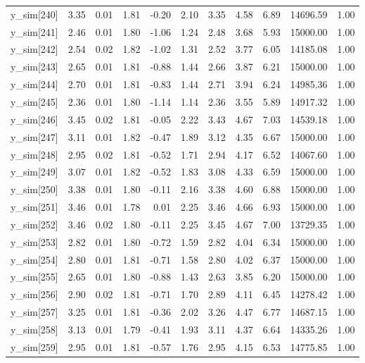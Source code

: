 \begin{table}[ht]
\begin{tabular}{rrrrrrrrrrr}
  y\_sim[240] & 3.35 & 0.01 & 1.81 & -0.20 & 2.10 & 3.35 & 4.58 & 6.89 & 14696.59 & 1.00 \\ 
  y\_sim[241] & 2.46 & 0.01 & 1.80 & -1.06 & 1.24 & 2.48 & 3.68 & 5.93 & 15000.00 & 1.00 \\ 
  y\_sim[242] & 2.54 & 0.02 & 1.82 & -1.02 & 1.31 & 2.52 & 3.77 & 6.05 & 14185.08 & 1.00 \\ 
  y\_sim[243] & 2.65 & 0.01 & 1.81 & -0.88 & 1.44 & 2.66 & 3.87 & 6.21 & 15000.00 & 1.00 \\ 
  y\_sim[244] & 2.70 & 0.01 & 1.81 & -0.83 & 1.44 & 2.71 & 3.94 & 6.24 & 14985.36 & 1.00 \\ 
  y\_sim[245] & 2.36 & 0.01 & 1.80 & -1.14 & 1.14 & 2.36 & 3.55 & 5.89 & 14917.32 & 1.00 \\ 
  y\_sim[246] & 3.45 & 0.02 & 1.81 & -0.05 & 2.22 & 3.43 & 4.67 & 7.03 & 14539.18 & 1.00 \\ 
  y\_sim[247] & 3.11 & 0.01 & 1.82 & -0.47 & 1.89 & 3.12 & 4.35 & 6.67 & 15000.00 & 1.00 \\ 
  y\_sim[248] & 2.95 & 0.02 & 1.81 & -0.52 & 1.71 & 2.94 & 4.17 & 6.52 & 14067.60 & 1.00 \\ 
  y\_sim[249] & 3.07 & 0.01 & 1.82 & -0.52 & 1.83 & 3.08 & 4.33 & 6.59 & 15000.00 & 1.00 \\ 
  y\_sim[250] & 3.38 & 0.01 & 1.80 & -0.11 & 2.16 & 3.38 & 4.60 & 6.88 & 15000.00 & 1.00 \\ 
  y\_sim[251] & 3.46 & 0.01 & 1.78 & 0.01 & 2.25 & 3.46 & 4.66 & 6.93 & 15000.00 & 1.00 \\ 
  y\_sim[252] & 3.46 & 0.02 & 1.80 & -0.11 & 2.25 & 3.45 & 4.67 & 7.00 & 13729.35 & 1.00 \\ 
  y\_sim[253] & 2.82 & 0.01 & 1.80 & -0.72 & 1.59 & 2.82 & 4.04 & 6.34 & 15000.00 & 1.00 \\ 
  y\_sim[254] & 2.80 & 0.01 & 1.81 & -0.71 & 1.58 & 2.80 & 4.02 & 6.37 & 15000.00 & 1.00 \\ 
  y\_sim[255] & 2.65 & 0.01 & 1.80 & -0.88 & 1.43 & 2.63 & 3.85 & 6.20 & 15000.00 & 1.00 \\ 
  y\_sim[256] & 2.90 & 0.02 & 1.81 & -0.71 & 1.70 & 2.89 & 4.11 & 6.45 & 14278.42 & 1.00 \\ 
  y\_sim[257] & 3.25 & 0.01 & 1.81 & -0.36 & 2.02 & 3.26 & 4.47 & 6.77 & 14687.15 & 1.00 \\ 
  y\_sim[258] & 3.13 & 0.01 & 1.79 & -0.41 & 1.93 & 3.11 & 4.37 & 6.64 & 14335.26 & 1.00 \\ 
  y\_sim[259] & 2.95 & 0.01 & 1.81 & -0.57 & 1.76 & 2.95 & 4.15 & 6.53 & 14775.85 & 1.00 \\ 

\end{tabular}
\end{table}
